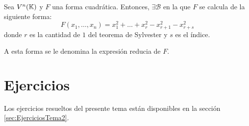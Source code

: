 \begin{teo}
    Sea $V^n(\mathbb{K})$ y $F$ una forma cuadrática. Entonces, $\exists \mathcal{B}$ en la que $F$ se calcula de la siguiente forma:
    \begin{equation*}
        F(x_1, \dots, x_n) = x_1^2 + \dots + x_r^2 - x_{r+1}^2 - x_{r+s}^2
    \end{equation*}
    donde $r$ es la cantidad de $1$ del teorema de Sylvester y $s$ es el índice.

    A esta forma se le denomina la expresión reducia de $F$.
\end{teo}


\section{Ejercicios}
Los ejercicios resueltos del presente tema están disponibles en la sección \ref{sec:EjerciciosTema2}.
